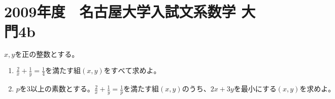 \documentclass{jsarticle}
\begin{document}
\section*{2009年度　名古屋大学入試文系数学 大門4b}
$ x,yを正の整数とする。$
\begin{enumerate}[(1)]
\item $\frac{2}{x} + \frac{1}{y} = \frac{1}{4}　を満たす組(x,y)をすべて求めよ。$
\item $pを3以上の素数とする。\frac{2}{x} + \frac{1}{y} = \frac{1}{p} を満たす組(x,y)のうち、2x+3yを最小にする(x,y)を求めよ。$
\end{enumerate}


\end{document}
